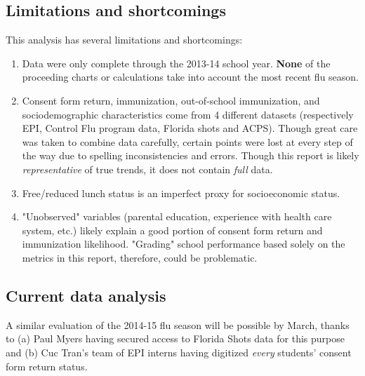 \subsection*{Limitations and shortcomings}
This analysis has several limitations and shortcomings: \begin{enumerate}
\item Data were only complete through the 2013-14 school year.  \textbf{None} of the proceeding charts or calculations take into account the most recent flu season.
\item Consent form return, immunization, out-of-school immunization, and sociodemographic characteristics come from 4 different datasets (respectively EPI, Control Flu program data, Florida shots and ACPS).  Though great care was taken to combine data carefully, certain points were lost at every step of the way due to spelling inconsistencies and errors.  Though this report is likely \emph{representative} of true trends, it does not contain \emph{full} data.
\item Free/reduced lunch status is an imperfect proxy for socioeconomic status.
\item "Unobserved" variables (parental education, experience with health care system, etc.) likely explain a good portion of consent form return and immunization likelihood. "Grading" school performance based solely on the metrics in this report, therefore, could be problematic.  
\end{enumerate}

\subsection*{Current data analysis}
A similar evaluation of the 2014-15 flu season will be possible by March, thanks to (a) Paul Myers having secured access to Florida Shots data for this purpose and (b) Cuc Tran's team of EPI interns having digitized \emph{every} students' consent form return status.


